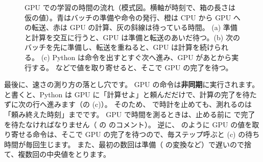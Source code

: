 \begin{figure}[!tbp]
\caption{GPU での学習の時間の流れ（模式図。横軸が時刻で、箱の長さは仮の値）。青はバッチの準備や命令の発行、橙は CPU から GPU への転送、赤は GPU の計算、灰の斜線は待っている時間。
(a) 準備と計算を交互に行うと、GPU は準備と転送のあいだ待つ。(b) 次のバッチを先に準備し、転送を重ねると、GPU は計算を続けられる。
(c) Python は命令を出すとすぐ次へ進み、GPU があとから実行する。 などで値を取り寄せると、そこで GPU の完了を待つ。}
\label{fig:gpu-timeline}
\end{figure}


最後に、速さの測り方の落とし穴です。
GPU の命令は\textbf{非同期}に実行されます。
 と書くと、Python は GPU に「計算せよ」と頼んだだけで、計算の完了を待たずに次の行へ進みます（の (c)）。
そのため、 で時計を止めても、測れるのは「頼み終えた時刻」までです。
GPU で時間を測るときは、止める前に  で完了を待たなければなりません（ の  のコメント）。
逆に、 のように GPU の値を取り寄せる命令は、そこで GPU の完了を待つので、毎ステップ呼ぶと (c) の待ち時間が毎回生じます。
また、最初の数回は準備（ の変換など）で遅いので捨て、複数回の中央値をとります。

